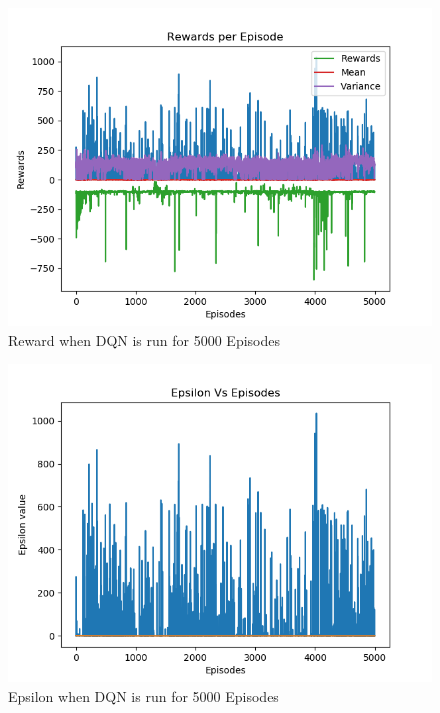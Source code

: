 \documentclass[doc, onecolumn, 12pt]{apa6}
\begin{document}
\begin{figure}
\label{DQN_5000Ep_Rewards}
\includegraphics[width =\textwidth, height=0.4 \textheight]{results/dqn/5000_ep/Rewards.png}
\caption{Reward  when DQN is run for 5000 Episodes}
\end{figure}

\begin{figure}
\label{DQN_5000Ep_Epsilon}
\includegraphics[width =\textwidth, height=0.4 \textheight]{results/dqn/5000_ep/Epsilon.png}
\caption{Epsilon when DQN is run for 5000 Episodes}
\end{figure}

\FloatBarrier 
\end{document}
